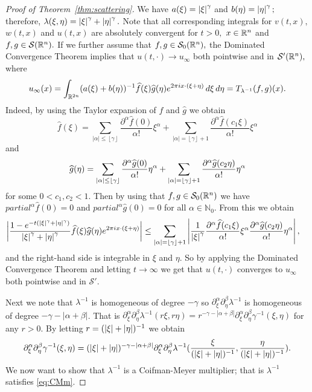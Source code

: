 { 
 \begin{proof}[Proof of Theorem~\ref{thm:scattering}] We have $a(\xi)=\left\vert \xi \right\vert^\gamma$ and $b(\eta)=\left\vert \eta \right\vert^\gamma;$ therefore, $\lambda(\xi,\eta)=\left\vert \xi \right\vert^\gamma+\left\vert \eta \right\vert^\gamma.$ Note that all corresponding integrals for $v(t,x),$ $w(t,x)$ and $u(t,x)$ are absolutely convergent for $t>0,$ $x\in{{\mathbb R}^n}$ and $f,g\in {\mathcal{S}}({{\mathbb R}^n}).$ If we further assume that $f,g\in {\mathcal{S}_0}({{\mathbb R}^n}),$ the Dominated Convergence Theorem implies that $u(t,\cdot)\to u_\infty$  both pointwise and in ${\mathcal{S}'}({{\mathbb R}^n}),$ where
$$
u_\infty(x)=\int_{\mathbb{R}^{2n}} (a(\xi)+b(\eta))^{-1}\widehat{f}(\xi)\widehat{g}(\eta)e^{2\pi i x \cdot (\xi + \eta)}\, d\xi\, d\eta=T_{\lambda^{-1}} (f,g)(x).
$$
Indeed, by using the Taylor expansion of $\widehat{f}$ and $\widehat{g}$ we obtain
\[\widehat{f}(\xi) = 
\sum_{|\alpha|\leq 
\left\lfloor\gamma\right\rfloor} 
\frac{\partial^\alpha \widehat{f}(0)}{\alpha !}\xi^\alpha
 + \sum_{|\alpha| = 
 \left\lfloor\gamma\right\rfloor + 1} \frac{\partial^\alpha \widehat{f}(c_1 \xi)}{\alpha !}\xi^\alpha \]
and 
\[\widehat{g}(\eta) = \sum_{\left\vert \alpha \right\vert\leq \left\lfloor\gamma\right\rfloor} \frac{\partial^\alpha \widehat{g}(0)}{\alpha !}\eta^\alpha + \sum_{\left\vert \alpha \right\vert = \left\lfloor\gamma\right\rfloor + 1} \frac{\partial^\alpha \widehat{g}(c_2 \eta)}{\alpha !}\eta^\alpha \]
for some $0<c_1 , c_2 <1$. Then by using that $f,g \in {\mathcal{S}_0}({{\mathbb R}^n})$ we have $partial^\alpha \widehat{f}(0) = 0$ and $partial^\alpha \widehat{g}(0) = 0$ for all $\alpha \in \mathbb{N}_0$. From this we obtain 
\begin{align*}
\left\vert \frac{1-e^{-t(\left\vert \xi \right\vert^\gamma + \left\vert \eta \right\vert^\gamma)}}{\left\vert \xi \right\vert^\gamma + \left\vert \eta \right\vert^\gamma}\widehat{f}(\xi)\widehat{g}(\eta) e^{2\pi i x\cdot (\xi + \eta)} \right\vert &\leq \sum_{\left\vert \alpha \right\vert = \left\lfloor\gamma\right\rfloor + 1} \left\vert \frac{1}{\left\vert \xi \right\vert^\gamma} \frac{\partial^\alpha \widehat{f}(c_1 \xi)}{\alpha !}\xi^\alpha\frac{\partial^\alpha \widehat{g}(c_2 \eta)}{\alpha !}\eta^\alpha \right\vert, 
\end{align*}
and the right-hand side is integrable in $\xi$ and $\eta$. So by applying the Dominated Convergence Theorem and letting $t \rightarrow \infty$ we get that $u(t,\cdot)$ converges to $u_\infty$ both pointwise and in $\mathcal{S}'$. 

Next we note that $\lambda^{-1}$ is homogeneous of degree $-\gamma$ so $\partial^\alpha_\xi \partial^\beta_\eta \lambda^{-1}$ is homogeneous of degree $-\gamma -|\alpha + \beta|$. That is $\partial^\alpha_\xi \partial^\beta_\eta \lambda^{-1} (r\xi, r\eta) = r^{-\gamma -|\alpha+\beta|}\partial^\alpha_\xi \partial^\beta_\eta \gamma^{-1}(\xi,\eta)$ for any $r>0$. By letting $r = (\left\vert \xi \right\vert + \left\vert \eta \right\vert)^{-1}$ we obtain 
$$\partial^\alpha_\xi \partial^\beta_\eta \gamma^{-1}(\xi,\eta) = (\left\vert \xi \right\vert + \left\vert \eta \right\vert)^{-\gamma -|\alpha+\beta|} \partial^\alpha_\xi \partial^\beta_\eta \lambda^{-1} (\frac{\xi}{(\left\vert \xi \right\vert + \left\vert \eta \right\vert)^{-1}}, \frac{\eta}{(\left\vert \xi \right\vert + \left\vert \eta \right\vert)^{-1}}).$$
We now want to show that $\lambda^{-1}$ is a Coifman-Meyer multiplier; that is $\lambda^{-1}$ satisfies \eqref{eq:CMm}.


\end{proof}}
